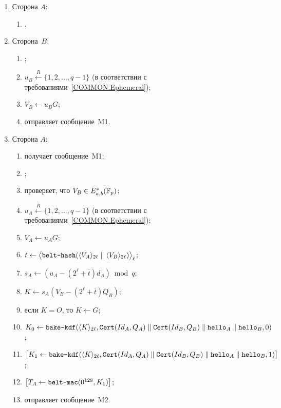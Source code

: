 \begin{enumerate}
\item
Сторона $A$:
\begin{enumerate}
\item
{}.
\end{enumerate}

\item
Сторона~$B$:
\begin{enumerate}
\item
{};
\item
$u_B\stackrel{R}{\leftarrow}\{1,2,\ldots,q-1\}$
(в соответствии с требованиями~\ref{COMMON.Ephemeral});
\item
$V_B\leftarrow u_B G$;
\item
отправляет сообщение~M1.
\end{enumerate}
\item
Сторона $A$:
\begin{enumerate}
\item
получает сообщение~M1;
\item
{};
\item
проверяет, что $V_B\in E_{a,b}^*(\mathbb{F}_p)$;
\item
$u_A\stackrel{R}{\leftarrow}\{1,2,\ldots,q-1\}$
(в соответствии с требованиями~\ref{COMMON.Ephemeral});
\item
$V_A\leftarrow u_A G$;
\item
$t\leftarrow\bigl\langle
\texttt{belt-hash}
(\langle V_A\rangle_{2\ell}\parallel\langle V_B\rangle_{2\ell})
\bigr\rangle_\ell$;
\item
$s_A\leftarrow (u_A-(2^\ell+\overline{t})d_A)\bmod q$;
\item
$K\leftarrow s_A(V_B-(2^\ell+\overline{t})Q_B)$;
\item
если $K=O$, то $K\leftarrow G$;
\item
$K_0\leftarrow\texttt{bake-kdf}
(\langle K\rangle_{2\ell},
\texttt{Cert}(Id_A,Q_A)\parallel \texttt{Cert}(Id_B,Q_B)\parallel 
\texttt{hello}_A\parallel\texttt{hello}_B,
0)$;
\item
$\mathbf{\bigl[}
K_1\leftarrow\texttt{bake-kdf}
(\langle K\rangle_{2\ell},
\texttt{Cert}(Id_A,Q_A)\parallel \texttt{Cert}(Id_B,Q_B)\parallel 
\texttt{hello}_A\parallel\texttt{hello}_B,
1)\mathbf{\bigr]}$;
\item
$\mathbf{\bigl[}T_A\leftarrow\texttt{belt-mac}(0^{128},K_1)\mathbf{\bigr]}$;
\item
отправляет сообщение~M2.
\end{enumerate}


\end{enumerate}
